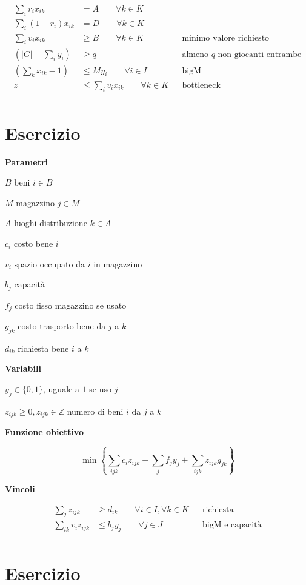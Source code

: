 \documentclass[10pt,a4paper,twoside,openright]{book}
\newcounter{es}
\newcommand{\Es}{
	\stepcounter{es}
	\section{Esercizio \arabic{es}}
	}
\newcommand{\Par}{\textbf{Parametri}}
\newcommand{\Var}{\textbf{Variabili}}
\newcommand{\Fob}{\textbf{Funzione obiettivo}}
\newcommand{\Vin}{\textbf{Vincoli}}
\begin{document}
\begin{align*}
	\sum _{i} r_{i} x_{ik} &=A\qquad\forall k\in K && \text{} \\
	\sum _{i}( 1-r_{i}) x_{ik} &=D\qquad\forall k\in K && \text{} \\
	\sum _{i} v_{i} x_{ik} &\geq B\qquad\forall k\in K && \text{minimo valore richiesto} \\
	\left( |G|-\sum _{i} y_{i}\right) &\geq q && \text{almeno $q$ non giocanti entrambe} \\
	\left(\sum _{k} x_{ik} -1\right) &\leq My_{i} \qquad\forall i\in I && \text{bigM} \\
	z&\leq \sum _{i} v_{i} x_{ik} \qquad\forall k\in K && \text{bottleneck} \\
\end{align*}

\Es

\Par

$B$ beni $i\in B$

$M$ magazzino $j\in M$

$A$ luoghi distribuzione $k\in A$

$c_{i}$ costo bene $i$

$v_{i}$ spazio occupato da $i$ in magazzino

$b_{j}$ capacità

$f_{j}$ costo fisso magazzino se usato

$g_{jk}$ costo trasporto bene da $j$ a $k$

$d_{ik}$ richiesta bene $i$ a $k$

\Var

$y_{j} \in \{0,1\}$, uguale a $1$ se uso $j$

$z_{ijk} \geq 0,z_{ijk} \in \mathbb{Z}$ numero di beni $i$ da $j$ a $k$

\Fob

\begin{equation*}
	\min\left\{\sum _{ijk} c_{i} z_{ijk} +\sum _{j} f_{j} y_{j} +\sum _{ijk} z_{ijk} g_{jk}\right\}
\end{equation*}

\Vin

\begin{align*}
	\sum _{j} z_{ijk} &\geq d_{ik} \qquad\forall i\in I,\forall k\in K && \text{richiesta} \\
	\sum _{ik} v_{i} z_{ijk} &\leq b_{j} y_{j} \qquad\forall j\in J && \text{bigM e capacità} \\
\end{align*}

\Es
\end{document}
